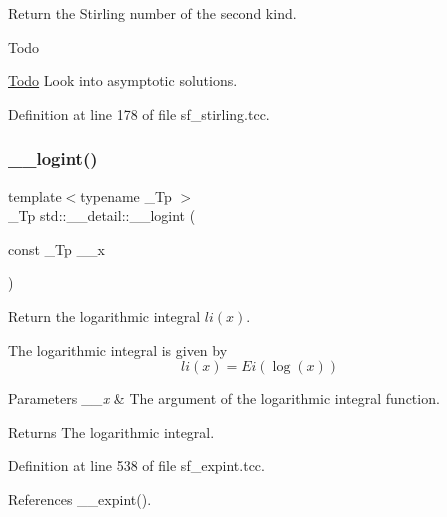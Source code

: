Return the Stirling number of the second kind.

\begin{DoxyRefDesc}{Todo}
\item[\hyperlink{todo__todo000017}{Todo}]Look into asymptotic solutions. \end{DoxyRefDesc}


Definition at line 178 of file sf\+\_\+stirling.\+tcc.

\mbox{\label{namespacestd_1_1____detail_a4d5f8cb2b4e6e192faba9418ec14149f}} 
\subsubsection{\texorpdfstring{\+\_\+\+\_\+logint()}{\_\_logint()}}
{\footnotesize\ttfamily template$<$typename \+\_\+\+Tp $>$ \\
\+\_\+\+Tp std\+::\+\_\+\+\_\+detail\+::\+\_\+\+\_\+logint (\begin{DoxyParamCaption}\item[{const \+\_\+\+Tp}]{\+\_\+\+\_\+x }\end{DoxyParamCaption})}



Return the logarithmic integral $ li(x) $. 

The logarithmic integral is given by \[ li(x) = Ei(\log(x)) \]


\begin{DoxyParams}{Parameters}
{\em \+\_\+\+\_\+x} & The argument of the logarithmic integral function. \\
\hline
\end{DoxyParams}
\begin{DoxyReturn}{Returns}
The logarithmic integral. 
\end{DoxyReturn}


Definition at line 538 of file sf\+\_\+expint.\+tcc.



References \+\_\+\+\_\+expint().

\mbox{\label{namespacestd_1_1____detail_a2ee185d74e39b87c74c3c428f8e73ee7}} 
